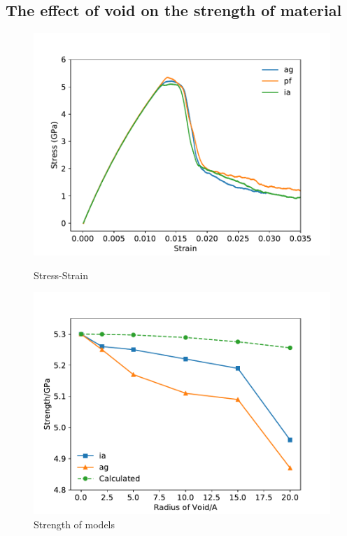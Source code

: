 \documentclass[materials,article,submit,moreauthors,pdftex,10pt,a4paper]{Definitions/mdpi}
\begin{document}
\subsection{The effect of void on the strength of material}

\begin{figure}[ht]
	\centering
	\begin{minipage}{0.495\textwidth}
		\includegraphics[width=1\linewidth]{img/allline}
		\centering
		\caption{Stress-Strain}
		\label{fig:stress&strain}
	\end{minipage}	
	\hfill
	\begin{minipage}{0.495\textwidth}		
		\includegraphics[width=1\linewidth]{img/effect_of_vol}
		\centering
		\caption{Strength of models}
		\label{fig:strength}
	\end{minipage}
\end{figure}
\end{document}
